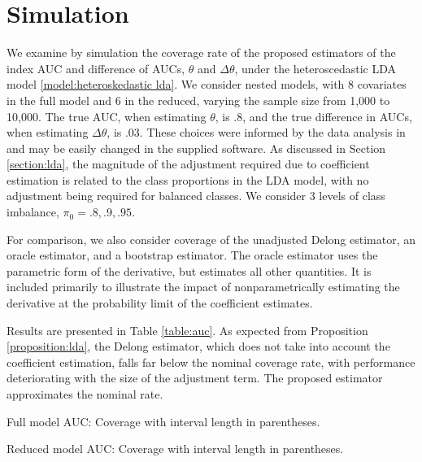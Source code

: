 \documentclass[12pt]{article}
\newcommand{\auc}{\theta}
\newcommand{\aucdiff}{\Delta\auc}
\theoremstyle{definition}
\begin{document}
\section{Simulation}\label{section:simulation}
We examine by simulation the coverage rate of the
proposed estimators of the index AUC and difference of AUCs, $\auc$
and $\aucdiff$, under the heteroscedastic LDA model
\eqref{model:heteroskedastic lda}.  We consider nested models, with 8
covariates in the full model and 6 in the reduced, varying the sample
size from 1,000 to 10,000. The true AUC, when estimating $\auc$, is
.8, and the true difference in AUCs, when estimating $\aucdiff$, is
.03. These choices were informed by the data analysis in
\citet{demler2017} and may be easily changed in the supplied
software. %
As discussed in Section \ref{section:lda}, the magnitude of the
adjustment required due to coefficient estimation is related to the
class proportions in the LDA model, with no adjustment being required
for balanced classes. We consider 3 levels of class imbalance,
$\pi_0=.8, .9, .95$.

For comparison, we also consider coverage of the unadjusted Delong
estimator, an oracle estimator, and a bootstrap estimator. The oracle
estimator uses the parametric form of the derivative, but estimates
all other quantities. It is included primarily to illustrate the
impact of nonparametrically estimating the derivative at the
probability limit of the coefficient estimates.

Results are presented in Table \ref{table:auc}. As expected from Proposition
\ref{proposition:lda}, the Delong estimator, which does not take into account the
coefficient estimation, falls far below the nominal coverage rate,
with performance deteriorating with the size of the adjustment
term. The proposed estimator approximates the nominal rate.

\begin{table}
  \centering
  
  \caption{Full model AUC: Coverage with interval length in parentheses.}
  \label{table:auc}
\end{table}


\begin{table}
  \centering
  
  \caption{Reduced model AUC: Coverage with interval length in parentheses.}
  \label{table:auc}
\end{table}
\end{document}
